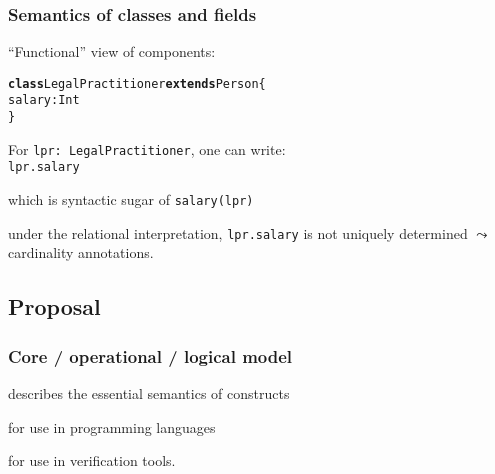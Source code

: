 \documentclass{beamer}
\begin{document}
\begin{frame}[fragile]\frametitle{Semantics of classes and fields}



  ``Functional'' view of components:
\begin{alltt}
\textbf{class} LegalPractitioner \textbf{extends} Person \{
      salary: Int
\}
\end{alltt}

For \texttt{lpr: LegalPractitioner}, one can write:\\
\texttt{lpr.salary}

which is syntactic sugar of \texttt{salary(lpr)}

 under the relational interpretation, \texttt{lpr.salary} is
not uniquely determined $\leadsto$ cardinality annotations.

\end{frame}
  
\subsection{Proposal}

\begin{frame}[fragile]\frametitle{Core / operational / logical model}

   describes the essential semantics of constructs

  \vspace{5mm}
   for use in programming languages

  \vspace{5mm}
   for use in verification tools.

\end{frame}
\end{document}

